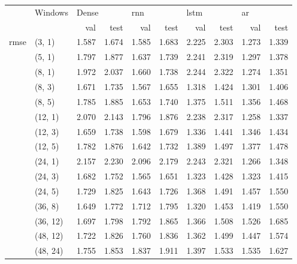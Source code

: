 \vspace{2em}

\begin{tabular}{ll|rr|rr|rr|rr}
\toprule
      &   Windows       & \multicolumn{2}{l}{Dense} & \multicolumn{2}{l}{\acrshort{rnn}} & \multicolumn{2}{l}{\acrshort{lstm}} & \multicolumn{2}{l}{\acrshort{ar}} \\*
      &          & val & test & val & test & val & test & val & test \\*
\midrule
\multirow{15}{*}{\acrshort{rmse}} & (3, 1) &     1.587 &      1.674 &   1.585 &    1.683 &    2.225 &     2.303 &  1.273 &   1.339 \\*
      & (5, 1) &     1.797 &      1.877 &   1.637 &    1.739 &    2.241 &     2.319 &  1.297 &   1.378 \\*
      & (8, 1) &     1.972 &      2.037 &   1.660 &    1.738 &    2.244 &     2.322 &  1.274 &   1.351 \\*
      & (8, 3) &     1.671 &      1.735 &   1.567 &    1.655 &    1.318 &     1.424 &  1.301 &   1.406 \\*
      & (8, 5) &     1.785 &      1.885 &   1.653 &    1.740 &    1.375 &     1.511 &  1.356 &   1.468 \\*
      & (12, 1) &     2.070 &      2.143 &   1.796 &    1.876 &    2.238 &     2.317 &  1.258 &   1.337 \\*
      & (12, 3) &     1.659 &      1.738 &   1.598 &    1.679 &    1.336 &     1.441 &  1.346 &   1.434 \\*
      & (12, 5) &     1.782 &      1.876 &   1.642 &    1.732 &    1.389 &     1.497 &  1.377 &   1.478 \\*
      & (24, 1) &     2.157 &      2.230 &   2.096 &    2.179 &    2.243 &     2.321 &  1.266 &   1.348 \\*
      & (24, 3) &     1.682 &      1.752 &   1.565 &    1.651 &    1.323 &     1.428 &  1.323 &   1.415 \\*
      & (24, 5) &     1.729 &      1.825 &   1.643 &    1.726 &    1.368 &     1.491 &  1.457 &   1.550 \\*
      & (36, 8) &     1.649 &      1.772 &   1.712 &    1.795 &    1.320 &     1.453 &  1.419 &   1.550 \\*
      & (36, 12) &     1.697 &      1.798 &   1.792 &    1.865 &    1.366 &     1.508 &  1.526 &   1.685 \\*
      & (48, 12) &     1.722 &      1.826 &   1.760 &    1.836 &    1.362 &     1.499 &  1.447 &   1.574 \\*
      & (48, 24) &     1.755 &      1.853 &   1.837 &    1.911 &    1.397 &     1.533 &  1.535 &   1.627 \\*
\bottomrule
\end{tabular}

